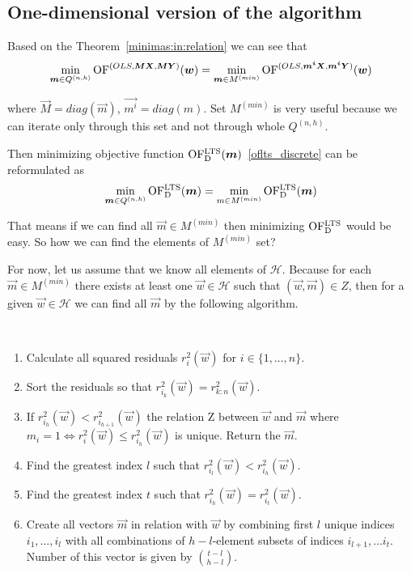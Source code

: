 \subsection{ One-dimensional version of the algorithm}

Based on the Theorem~\ref{minimas:in:relation} we can see that
\begin{equation}
    \operatorname*{min}_{\boldsymbol{m} \in Q^{(n,h)}} \operatorname{OF}^{(OLS,\boldsymbol{M}\boldsymbol{X}, \boldsymbol{M}\boldsymbol{Y})} (\boldsymbol{w}) =
    \operatorname*{min}_{ \boldsymbol{m} \in M^{(min)}} \operatorname{OF}^{(OLS,\boldsymbol{m^i}\boldsymbol{X}, \boldsymbol{m^i}\boldsymbol{Y})} (\boldsymbol{w})
\end{equation}

where $\vec{M} = diag(\vec{m})$, $\vec{m^i} = diag(m)$. Set $M^{(min)}$ is very useful because we can iterate only through this set and not through whole $Q^{(n,h)}$.

Then minimizing objective function $\operatorname{OF^{LTS}_D}(\boldsymbol{m})$~\eqref{oflts_discrete} can be reformulated as 
\begin{equation} \label{mminqnh}
    \operatorname*{min}_{\boldsymbol{m} \in Q^{(n,h)}}  \operatorname{OF^{LTS}_D}(\boldsymbol{m}) = \operatorname*{min}_{m \in M^{(min)}} \operatorname{OF^{LTS}_D}(\boldsymbol{m})
\end{equation}


That means if we can find all $\vec{m} \in M^{(min)}$ then minimizing $\operatorname{OF^{LTS}_D}$ would be easy.
So how we can find the elements of $M^{(min)}$ set? 

For now, let us assume that we know all elements of $\mathcal{H}$. Because for each $\vec{m} \in M^{(min)}$ there exists at least one $\vec{w} \in \mathcal{H}$ such that $(\vec{w}, \vec{m}) \in Z$, then for a given $\vec{w} \in \mathcal{H}$ we can find all $\vec{m}$ by the following algorithm.


\begin{algo} \label{find:all:m:in:relation}
    \mbox{}\vspace{\dimexpr-\baselineskip-\topsep}
\\
    \begin{enumerate}
        \item Calculate all squared residuals $r^{2}_i(\vec{w})$ for $i \in \{{1, \ldots,n\}}$.
        \item Sort the residuals so that $r^{2}_{i_k}(\vec{w}) = r^{2}_{k:n}(\vec{w})$.
        \item If $r^{2}_{i_h}(\vec{w}) < r^{2}_{i_{h+1}}(\vec{w})$ the relation Z between $\vec{w}$ and $\vec{m}$ where $m_i = 1  \Leftrightarrow r^{2}_i(\vec{w}) \leq  r^{2}_{i_h}(\vec{w})$ is unique. Return the $\vec{m}$.
        \item Find the greatest index $l$ such that $r^{2}_{i_l}(\vec{w}) < r^{2}_{i_h}(\vec{w})$.
        \item Find the greatest index $t$ such that $ r^{2}_{i_h}(\vec{w}) = r^{2}_{i_t}(\vec{w})$.
        \item Create all vectors $\vec{m}$ in relation with $\vec{w}$ by combining first $l$ unique indices $i_1, \ldots ,i_l$ with all combinations of $h-l$-element subsets of indices $i_{l+1}, \ldots i_t$. Number of this vector is given by $\binom{t-l}{h-l}$.
    \end{enumerate}
\end{algo}

